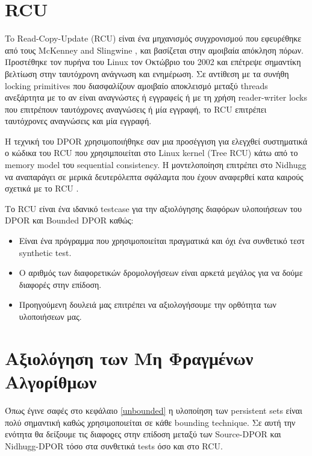 \section{RCU}

To Read-Copy-Update (RCU) είναι ένα μηχανισμός συγχρονισμού που εφευρέθηκε από τους McKenney and Slingwine \cite{McKenney98},
και βασίζεται στην αμοιβαία απόκληση πόρων. Προστέθηκε τον πυρήνα του Linux τον Οκτώβριο του 2002 και επέτρεψε σημαντίκη 
βελτίωση στην ταυτόχρονη ανάγνωση και ενημέρωση. Σε αντίθεση με τα συνήθη locking primitives που διασφαλίζουν αμοιβαίο αποκλεισμό
μεταξύ threads ανεξάρτητα με το αν είναι αναγνώστες ή εγγραφείς ή με τη χρήση reader-writer locks που επιτρέπουν ταυτόχρονες
αναγνώσεις ή μία εγγραφή, το RCU επιτρέπει ταυτόχρονες αναγνώσεις και μία εγγραφή.

Η τεχνική του DPOR χρησιμοποιήθηκε σαν μια προσέγγιση για ελεγχθεί συστηματικά ο κώδικα του RCU που χρησιμποιείται στο Linux kernel (Tree
RCU) κάτω από το memory model του sequential consistency. Η μοντελοποίηση επιτρέπει στο Nidhugg
να αναπαράγει σε μερικά δευτερόλεπτα σφάλαμτα που έχουν αναφερθεί κατα καιρούς σχετικά με το RCU \cite{Spin}.

Το RCU είναι ένα ιδανικό testcase για την αξιολόγησης διαφόρων υλοποιήσεων του DPOR και Bounded DPOR καθώς:
\begin{itemize}
\item Είναι ένα πρόγραμμα που χρησιμοποιείται πραγματικά και όχι ένα συνθετικό τεστ synthetic test.
\item Ο αριθμός των διαφορετικών δρομολογήσεων είναι αρκετά μεγάλος για να δούμε διαφορές στην επίδοση.
\item Προηγούμενη δουλειά  \cite{Spin} μας επιτρέπει να αξιολογήσουμε την ορθότητα των υλοποιήσεων μας.
\end{itemize}


\section{Αξιολόγηση των Μη Φραγμένων Αλγορίθμων}
Όπως έγινε σαφές στο κεφάλαιο \ref{unbounded} η υλοποίηση των persistent sets είναι πολύ σημαντική καθώς χρησιμοποιείται
σε κάθε bounding technique. Σε αυτή την ενότητα θα δείξουμε τις διαφοϱες στην επίδοση μεταξύ των Source-DPOR και
Nidhugg-DPOR τόσο στα συνθετικά tests όσο και στο RCU.

